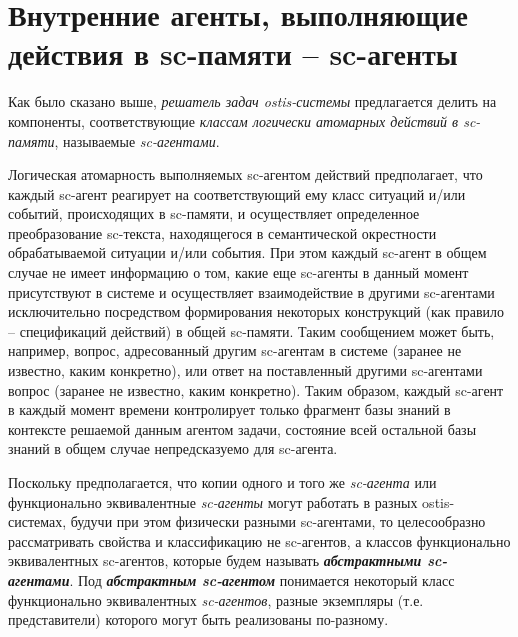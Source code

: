 \section{Внутренние агенты, выполняющие действия в sc-памяти -- sc-агенты}
\label{sec_ps_agents}

Как было сказано выше, \textit{решатель задач ostis-системы} предлагается делить на компоненты, соответствующие \textit{классам логически атомарных действий в sc-памяти}, называемые \textit{sc-агентами}.

\begin{SCn}
\end{SCn}

Логическая атомарность выполняемых sc-агентом действий предполагает, что каждый sc-агент реагирует на соответствующий ему класс ситуаций и/или событий, происходящих в sc-памяти, и осуществляет определенное преобразование sc-текста, находящегося в семантической окрестности обрабатываемой ситуации и/или события. При этом каждый sc-агент в общем случае не имеет информацию о том, какие еще sc-агенты в данный момент присутствуют в системе и осуществляет взаимодействие в другими sc-агентами исключительно посредством формирования некоторых конструкций (как правило – спецификаций действий) в общей sc-памяти. Таким сообщением может быть, например, вопрос, адресованный другим sc-агентам в системе (заранее не известно, каким конкретно), или ответ на поставленный другими sc-агентами вопрос (заранее не известно, каким конкретно). Таким образом, каждый sc-агент в каждый момент времени контролирует только фрагмент базы знаний в контексте решаемой данным агентом задачи, состояние всей остальной базы знаний в общем случае непредсказуемо для sc-агента.

Поскольку предполагается, что копии одного и того же \textit{sc-агента} или функционально эквивалентные \textit{sc-агенты} могут работать в разных ostis-системах, будучи при этом физически разными sc-агентами, то целесообразно рассматривать свойства и классификацию не sc-агентов, а классов функционально эквивалентных sc-агентов, которые будем называть \textbf{\textit{абстрактными sc-агентами}}.
Под \textbf{\textit{абстрактным sc-агентом}} понимается некоторый класс функционально эквивалентных \textit{sc-агентов}, разные экземпляры (т.е. представители) которого могут быть реализованы по-разному.
	
